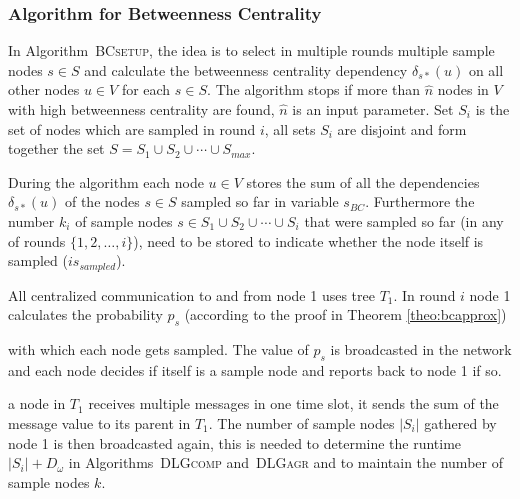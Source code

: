 \documentclass[11pt]{article}
\newcommand{\todoI}[1]{}\newcommand{\blueI}[1]{}
\newif\iffull
\newif\ifshort
\begin{document}
\subsubsection{Algorithm for Betweenness Centrality}\label{sec:algBC}






In Algorithm\iffull~\ref{alg:BC_setup_controlling}\fi~\textsc{BCsetup}, the idea is to select in multiple rounds multiple sample nodes $s\in S$ and calculate the betweenness centrality dependency $\delta_{s*}(u)$ on all other nodes $u\in V$ for each $s\in S$. The algorithm stops if more than $\hat{n}$ nodes in $V$ with high betweenness centrality are found, $\hat{n}$ is an input parameter. Set $S_i$ is the set of nodes which are sampled in round $i$, all sets $S_i$ are disjoint and form together the set $S=S_1\cup S_2\cup\cdots\cup S_{max}$. 

During the algorithm each node $u\in V$ stores the sum of all the dependencies $\delta_{s*}(u)$ of the nodes $s\in S$ sampled so far in variable $s_{BC}$. Furthermore the number $k_i$ of sample nodes $s\in S_1\cup S_2\cup\cdots\cup S_{i}$ that were sampled so far (in any of rounds $\{1,2,\dots, i\}$), need to be stored to indicate whether the node itself is sampled ($is_{sampled}$).\todoI{why?}

All centralized communication to and from node 1 uses tree $T_1$. In round  $i$ \iffull(Line \ref{line:BCprobstart} to \ref{line:BCprobend})\fi node 1 calculates the probability $p_s$ (according to the proof in Theorem \ref{theo:bcapprox})

with which each node gets sampled. The value of $p_s$ is broadcasted in the network and each node decides if itself is a sample node and reports back to node 1 if so.
\ifshort
If 
\fi
\iffull
 In Line \ref{line:BCaccsamples}, if 
\fi
 a node in $T_1$ receives multiple messages in one time slot, it sends the sum of the message value to its parent in $T_1$. The number of sample nodes $|S_i|$ gathered by node 1 is then broadcasted again, this is needed to determine the runtime $|S_i|+D_\omega$ in Algorithms\iffull~\ref{alg:DLGcomp}\fi~\textsc{DLGcomp} and\iffull~\ref{alg:DLGagr}\fi~\textsc{DLGagr} and to maintain the number of sample nodes $k$.
\end{document}
